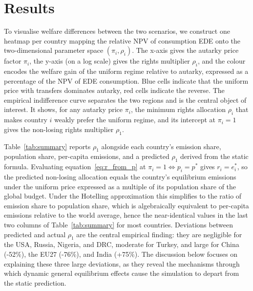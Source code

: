 \documentclass[12pt,english]{article}
\begin{document}
\section{Results}
\label{sec:results}


To visualise welfare differences between the two scenarios, we construct one heatmap per country mapping the relative NPV of consumption EDE onto the two-dimensional parameter space $(\pi_i, \rho_i)$. The x-axis gives the autarky price factor $\pi_i$, the y-axis (on a log scale) gives the rights multiplier $\rho_i$, and the colour encodes the welfare gain of the uniform regime relative to autarky, expressed as a percentage of the NPV of EDE consumption. Blue cells indicate that the uniform price with transfers dominates autarky, red cells indicate the reverse. The empirical indifference curve separates the two regions and is the central object of interest. It shows, for any autarky price $\pi_i$, the minimum rights allocation $\rho_i$ that makes country $i$ weakly prefer the uniform regime, and its intercept at $\pi_i=1$ gives the non-losing rights multiplier $\rho_1$.

Table~\ref{tab:summary} reports $\rho_1$ alongside each country's emission share, population share, per-capita emissions, and a predicted $\rho_1$ derived from the static formula. Evaluating equation~\eqref{eq:r_from_p} at $\pi_i = 1\iff p_i=p^*$ gives $r_i = e^*_i$, so the predicted non-losing allocation equals the country's equilibrium emissions under the uniform price expressed as a multiple of its population share of the global budget. Under the Hotelling approximation this simplifies to the ratio of emission share to population share, which is algebraically equivalent to per-capita emissions relative to the world average, hence the near-identical values in the last two columns of Table~\ref{tab:summary} for most countries. Deviations between predicted and actual $\rho_1$ are the central empirical finding: they are negligible for the USA, Russia, Nigeria, and DRC, moderate for Turkey, and large for China (-52\%), the EU27 (-76\%), and India (+75\%). The discussion below focuses on explaining these three large deviations, as they reveal the mechanisms through which dynamic general equilibrium effects cause the simulation to depart from the static prediction.
\end{document}
